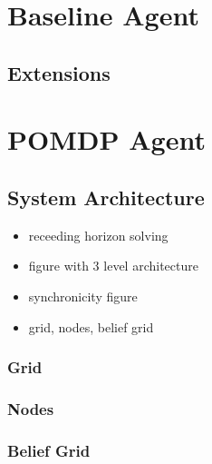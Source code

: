 \section{Baseline Agent}\label{sec:baseline}

\subsection{Extensions}
\section{POMDP Agent}\label{sec:POMDPagent}
\subsection{System Architecture}\label{subsec:sysarch}
\begin{itemize}
    \item receeding horizon solving
    \item figure with 3 level architecture 
    \item synchronicity figure
    \item grid, nodes, belief grid
\end{itemize}
\subsubsection{Grid}
\subsubsection{Nodes}
\subsubsection{Belief Grid}
